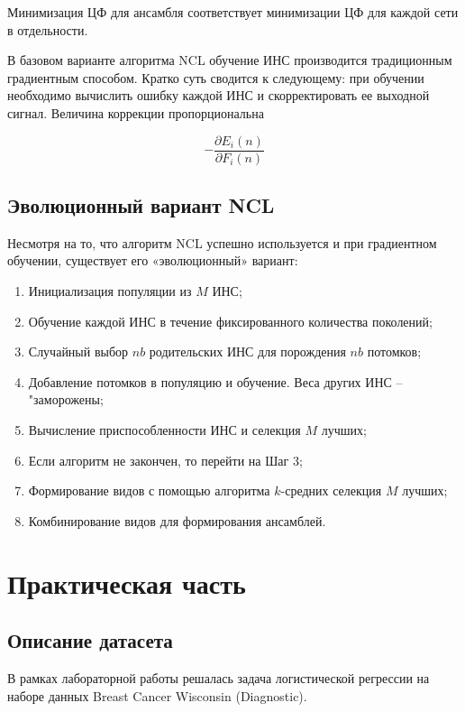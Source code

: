 \documentclass[12pt]{extarticle}
\begin{document}
Минимизация ЦФ для ансамбля соответствует минимизации ЦФ для каждой сети в отдельности.

В базовом варианте алгоритма NCL обучение ИНС производится традиционным градиентным способом. Кратко суть сводится к следующему: при обучении необходимо вычислить ошибку каждой ИНС и скорректировать ее выходной сигнал. Величина коррекции пропорциональна

\begin{equation} \label{eq:formula4}
 - \frac{\partial E_i(n)}{\partial F_i(n)}
\end{equation}

\subsection{Эволюционный вариант NCL}
Несмотря на то, что алгоритм NCL успешно используется и при градиентном обучении, существует его «эволюционный» вариант:

\begin{enumerate}
    \item Инициализация популяции из \(M\) ИНС;
    \item Обучение каждой ИНС в течение фиксированного количества поколений;
    \item Случайный выбор \(nb\) родительских ИНС для порождения \(nb\) потомков;
    \item Добавление потомков в популяцию и обучение. Веса других ИНС – "заморожены;
    \item Вычисление приспособленности ИНС и селекция \(M\) лучших;
    \item Если алгоритм не закончен, то перейти на Шаг 3;
    \item Формирование видов с помощью алгоритма \(k\)-средних селекция \(M\) лучших;
    \item Комбинирование видов для формирования ансамблей.
\end{enumerate}

\newpage %

\section{Практическая часть}

\subsection{Описание датасета}

В рамках лабораторной работы решалась задача логистической регрессии на наборе данных Breast Cancer Wisconsin (Diagnostic).
\end{document}
